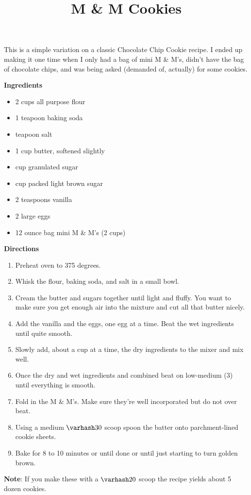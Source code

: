 \documentclass{article}
\title{M \& M  Cookies}
\begin{document}
This is a simple variation on a classic Chocolate Chip Cookie recipe. I ended up making it one
time when I only had a bag of mini M \& M's, didn't have the bag of chocolate chips, and was being
asked (demanded of, actually) for some cookies.

\textbf{Ingredients}

\begin{multicols}{2}
      \begin{itemize}
            \item 2 cups all purpose flour
            \item 1 teapoon baking soda
            \item {} teapoon salt

            \item 1 cup butter, softened slightly
            \item {} cup granulated sugar
            \item {} cup packed light brown sugar

            \item 2 teaspoons vanilla
            \item 2 large eggs
            \item 12 ounce bag mini M \& M's (2 cups)
      \end{itemize}
\end{multicols}

\textbf{Directions}

\begin{enumerate}
      \item Preheat oven to 375 degrees.
      \item Whisk the flour, baking soda, and salt in a small bowl.
      \item Cream the butter and sugars together until light and fluffy. You want to make sure you get
            enough air into the mixture and cut all that butter nicely.
      \item Add the vanilla and the eggs, one egg at a time. Beat the wet ingredients until quite smooth.
      \item Slowly add, about a cup at a time, the dry ingredients to the mixer and mix well.
      \item Once the dry and wet ingredients and combined beat on low-medium (3) until
            everything is smooth.
      \item Fold in the M \& M's. Make sure they're well incorporated but do not over beat.
      \item Using a medium $\varhash 30$ scoop spoon the batter onto parchment-lined cookie sheets.
      \item Bake for 8 to 10 minutes or until done or until just starting to turn golden brown.
\end{enumerate}

\medskip

\textbf{Note}: If you make these with a $\varhash 20$ scoop the recipe yields about 5 dozen cookies.

\end{document}
